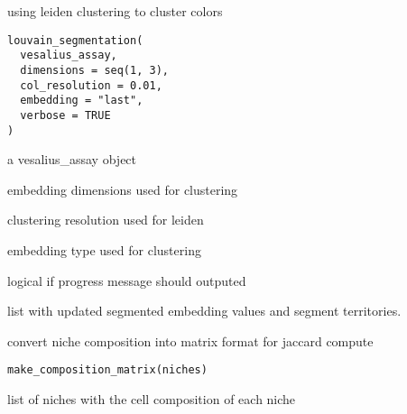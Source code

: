 \documentclass[a4paper]{book}
\begin{document}
%
\begin{Description}
using leiden clustering to cluster colors
\end{Description}
%
\begin{Usage}
\begin{verbatim}
louvain_segmentation(
  vesalius_assay,
  dimensions = seq(1, 3),
  col_resolution = 0.01,
  embedding = "last",
  verbose = TRUE
)
\end{verbatim}
\end{Usage}
%
\begin{Arguments}
\begin{ldescription}
\item[\code{vesalius\_assay}] a vesalius\_assay object

\item[\code{dimensions}] embedding dimensions used for clustering

\item[\code{col\_resolution}] clustering resolution used for leiden

\item[\code{embedding}] embedding type used for clustering

\item[\code{verbose}] logical if progress message should outputed
\end{ldescription}
\end{Arguments}
%
\begin{Value}
list with updated segmented embedding values 
and segment territories.
\end{Value}
%
\begin{Description}
convert niche composition into matrix format for jaccard compute
\end{Description}
%
\begin{Usage}
\begin{verbatim}
make_composition_matrix(niches)
\end{verbatim}
\end{Usage}
%
\begin{Arguments}
\begin{ldescription}
\item[\code{niches}] list of niches with the cell composition of each niche
\end{ldescription}
\end{Arguments}
\end{document}

